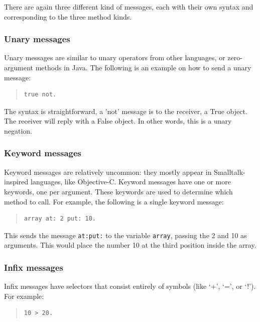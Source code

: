 \documentclass[a4paper]{article}
\begin{document}
There are again three different kind of messages, each with their own syntax and corresponding to the three method kinds.

\subsubsection{Unary messages}

Unary messages are similar to unary operators from other languages, or zero-argument methods in Java.
The following is an example on how to send a unary message:

\begin{quote}
\begin{lstlisting}
true not.
\end{lstlisting}
\end{quote}

The syntax is straightforward, a 'not' message is to the receiver, a True object.
The receiver will reply with a False object. In other words, this is a unary negation.

\subsubsection{Keyword messages}

Keyword messages are relatively uncommon: they mostly appear in Smalltalk-inspired languages, like Objective-C.
Keyword messages have one or more keywords, one per argument.
These keywords are used to determine which method to call.
For example, the following is a single keyword message:

\begin{quote}
\begin{lstlisting}
array at: 2 put: 10.
\end{lstlisting}
\end{quote}

This sends the message \texttt{at:put:} to the variable \texttt{array}, passing the 2 and 10 as arguments. This would place the number 10 at the third position inside the array.



\subsubsection{Infix messages}

Infix messages have selectors that consist entirely of symbols (like `+', `=', or `!'). For example:

\begin{quote}
\begin{lstlisting}
10 > 20.
\end{lstlisting}
\end{quote}
\end{document}
